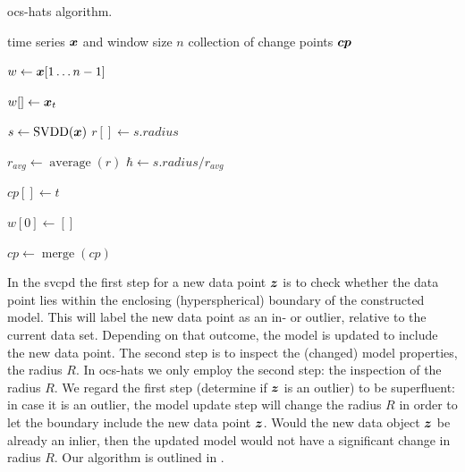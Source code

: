 

\begin{algorithm}
\caption{\acrlong{ocs-hats} algorithm.}
\label{alg:ocs-hats}
\begin{algorithmic}[1]
\Require time series $\vectorsym{x}$ and window size $n$
\Ensure collection of change points $\vectorsym{cp}$

\State $w \leftarrow \vectorsym{x}[1 \dots n-1]$ 

  \State $w[] \leftarrow \vectorsym{x}_t$ 

  \State $s \leftarrow \operatorname*{SVDD}(\vectorsym{x})$ 
  \State $r[] \leftarrow s.radius$ 

  \State $r_{avg} \leftarrow \operatorname*{average}(r)$
  \State $\hbar \leftarrow s.radius / r_{avg}$ 

   
    \State $cp[] \leftarrow t$ 
  \EndIf

  \State $w[0] \leftarrow []$ 
\EndWhile

\State $cp \leftarrow \operatorname*{merge}(cp)$ 
\end{algorithmic}
\end{algorithm}


In the \gls{svcpd} the first step for a new data point $\vectorsym{z}$ is to check whether the data point lies within the enclosing (hyperspherical) boundary of the constructed model.
This will label the new data point as an in- or outlier, relative to the current data set.
Depending on that outcome, the model is updated to include the new data point.
The second step is to inspect the (changed) model properties, \ie the radius $R$.
In \gls{ocs-hats} we only employ the second step: the inspection of the radius $R$.
We regard the first step (determine if $\vectorsym{z}$ is an outlier) to be superfluent: in case it is an outlier, the model update step will change the radius $R$ in order to let the boundary include the new data point $\vectorsym{z}$.
Would the new data object $\vectorsym{z}$ be already an inlier, then the updated model would not have a significant change in radius $R$.
Our algorithm is outlined in .


